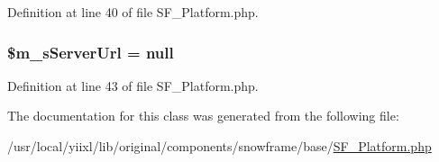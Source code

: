 Definition at line 40 of file SF\_\-Platform.php.

\hypertarget{classSF__Platform_af011645fea7e741d5cffcbe968799d90}{
\subsubsection[{\$m\_\-sServerUrl}]{\setlength{\rightskip}{0pt plus 5cm}\$m\_\-sServerUrl = null}}
\label{classSF__Platform_af011645fea7e741d5cffcbe968799d90}


Definition at line 43 of file SF\_\-Platform.php.



The documentation for this class was generated from the following file:\begin{DoxyCompactItemize}
\item 
/usr/local/yiixl/lib/original/components/snowframe/base/\hyperlink{SF__Platform_8php}{SF\_\-Platform.php}\end{DoxyCompactItemize}
